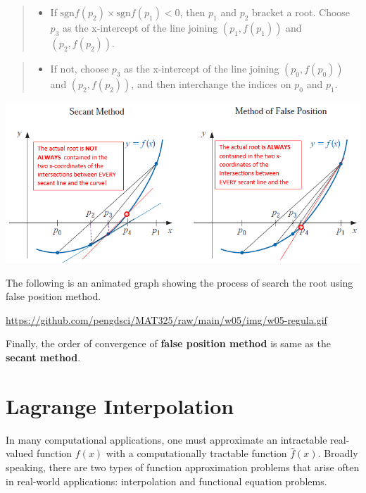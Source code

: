 \documentclass[
]{book}
\providecommand{\tightlist}{%
  \setlength{\itemsep}{0pt}\setlength{\parskip}{0pt}}
\begin{document}
\begin{quote}
\begin{itemize}
\tightlist
\item
  If \(\text{sgn} f ( p_2) \times \text{sgn} f ( p_1) < 0\), then \(p_1\) and \(p_2\) bracket a root. Choose \(p_3\) as the x-intercept of the line joining \(( p_1, f ( p_1))\) and \(( p_2, f ( p_2))\).
\end{itemize}
\end{quote}

\begin{quote}
\begin{itemize}
\tightlist
\item
  If not, choose \(p_3\) as the x-intercept of the line joining \(( p_0, f ( p_0))\) and \(( p_2, f ( p_2))\), and then interchange the indices on \(p_0\) and \(p_1\).
\end{itemize}
\end{quote}

\hfill\break

\begin{center}\includegraphics[width=0.8\linewidth]{img05/w05-SecantFalsePosition} \end{center}

The following is an animated graph showing the process of search the root using false position method.

\url{https://github.com/pengdsci/MAT325/raw/main/w05/img/w05-regula.gif}

Finally, the order of convergence of \textbf{false position method} is same as the \textbf{secant method}.

\hypertarget{lagrange-interpolation}{%
\chapter{Lagrange Interpolation}\label{lagrange-interpolation}}

In many computational applications, one must approximate an intractable real-valued function \(f(x)\) with a computationally tractable function \(\hat{f}(x)\). Broadly speaking, there are two types of function approximation problems that arise often in real-world applications: interpolation and functional equation problems.
\end{document}

